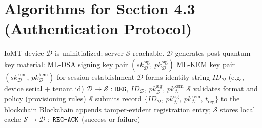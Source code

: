 \documentclass{article}
\begin{document}
\section*{Algorithms for Section 4.3 (Authentication Protocol)}

\begin{algorithm}[!t]
\caption{Registration Phase}
\label{alg:registration}
\begin{algorithmic}[1]
\Require IoMT device $\mathcal{D}$ is uninitialized; server $\mathcal{S}$ reachable.
\State $\mathcal{D}$ generates post-quantum key material:
\State \quad ML-DSA signing key pair $(sk_{\mathcal{D}}^{\mathrm{sig}},\, pk_{\mathcal{D}}^{\mathrm{sig}})$
\State \quad ML-KEM key pair $(sk_{\mathcal{D}}^{\mathrm{kem}},\, pk_{\mathcal{D}}^{\mathrm{kem}})$ for session establishment
\State $\mathcal{D}$ forms identity string $ID_{\mathcal{D}}$ (e.g., device serial + tenant id)
\State $\mathcal{D} \rightarrow \mathcal{S}$ : $\texttt{REG},\, ID_{\mathcal{D}},\, pk_{\mathcal{D}}^{\mathrm{sig}},\, pk_{\mathcal{D}}^{\mathrm{kem}}$
\State $\mathcal{S}$ validates format and policy (provisioning rules)
\State $\mathcal{S}$ submits record $\{ID_{\mathcal{D}},\, pk_{\mathcal{D}}^{\mathrm{sig}},\, pk_{\mathcal{D}}^{\mathrm{kem}},\, t_{\mathrm{reg}}\}$ to the blockchain
\State Blockchain appends tamper-evident registration entry; $\mathcal{S}$ stores local cache
\State $\mathcal{S} \rightarrow \mathcal{D}$ : $\texttt{REG\text{-}ACK}$ (success or failure)
\end{algorithmic}
\end{algorithm}
\end{document}
